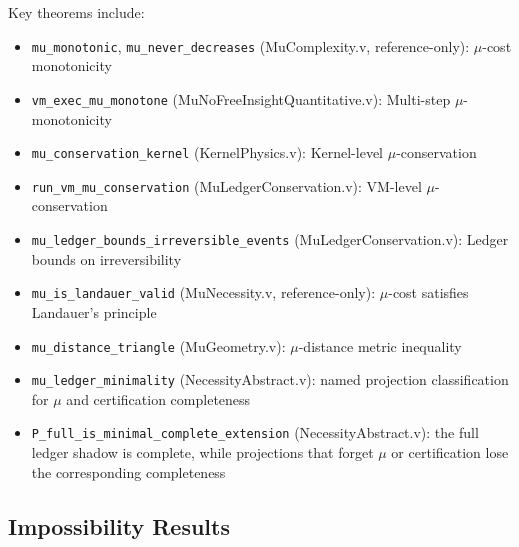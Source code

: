 Key theorems include:
\begin{itemize}
    \item \texttt{mu\_monotonic}, \texttt{mu\_never\_decreases} (MuComplexity.v, reference-only): $\mu$-cost monotonicity
    \item \texttt{vm\_exec\_mu\_monotone} (MuNoFreeInsightQuantitative.v): Multi-step $\mu$-monotonicity
    \item \texttt{mu\_conservation\_kernel} (KernelPhysics.v): Kernel-level $\mu$-conservation
    \item \texttt{run\_vm\_mu\_conservation} (MuLedgerConservation.v): VM-level $\mu$-conservation
    \item \texttt{mu\_ledger\_bounds\_irreversible\_events} (MuLedgerConservation.v): Ledger bounds on irreversibility
    \item \texttt{mu\_is\_landauer\_valid} (MuNecessity.v, reference-only): $\mu$-cost satisfies Landauer's principle
    \item \texttt{mu\_distance\_triangle} (MuGeometry.v): $\mu$-distance metric inequality
    \item \texttt{mu\_ledger\_minimality} (NecessityAbstract.v): named projection classification for $\mu$ and certification completeness
    \item \texttt{P\_full\_is\_minimal\_complete\_extension} (NecessityAbstract.v): the full ledger shadow is complete, while projections that forget $\mu$ or certification lose the corresponding completeness
\end{itemize}

\subsection{Impossibility Results}

